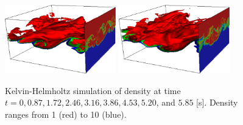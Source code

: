\documentclass[final]{siamltex}
\begin{document}
\begin{figure}
\begin{center}
\includegraphics[width=1.9in]{KHLM_3d7}
\includegraphics[width=1.9in]{KHLM_3d8}
\caption{Kelvin-Helmholtz simulation of density at time
         $t=0, 0.87, 1.72, 2.46, 3.16, 3.86, 4.53, 5.20$, and $5.85$ [s].
         Density ranges from 1 (red) to 10 (blue).}\label{fig:KHLM_3D}
\end{center}
\end{figure}



\end{document}
